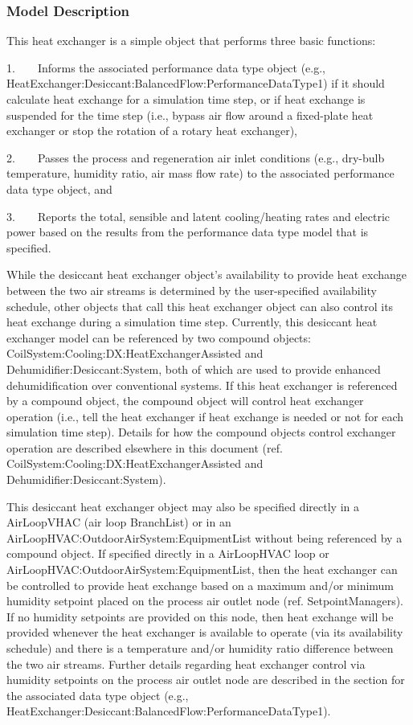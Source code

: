 \subsubsection{Model Description}\label{model-description-2-006}

This heat exchanger is a simple object that performs three basic functions:

1.~~~~Informs the associated performance data type object (e.g., HeatExchanger:Desiccant:BalancedFlow:PerformanceDataType1) if it should calculate heat exchange for a simulation time step, or if heat exchange is suspended for the time step (i.e., bypass air flow around a fixed-plate heat exchanger or stop the rotation of a rotary heat exchanger),

2.~~~~Passes the process and regeneration air inlet conditions (e.g., dry-bulb temperature, humidity ratio, air mass flow rate) to the associated performance data type object, and

3.~~~~Reports the total, sensible and latent cooling/heating rates and electric power based on the results from the performance data type model that is specified.

While the desiccant heat exchanger object's availability to provide heat exchange between the two air streams is determined by the user-specified availability schedule, other objects that call this heat exchanger object can also control its heat exchange during a simulation time step. Currently, this desiccant heat exchanger model can be referenced by two compound objects: CoilSystem:Cooling:DX:HeatExchangerAssisted and Dehumidifier:Desiccant:System, both of which are used to provide enhanced dehumidification over conventional systems. If this heat exchanger is referenced by a compound object, the compound object will control heat exchanger operation (i.e., tell the heat exchanger if heat exchange is needed or not for each simulation time step). Details for how the compound objects control exchanger operation are described elsewhere in this document (ref. CoilSystem:Cooling:DX:HeatExchangerAssisted and Dehumidifier:Desiccant:System).

This desiccant heat exchanger object may also be specified directly in a AirLoopVHAC (air loop BranchList) or in an AirLoopHVAC:OutdoorAirSystem:EquipmentList without being referenced by a compound object. If specified directly in a AirLoopHVAC loop or AirLoopHVAC:OutdoorAirSystem:EquipmentList, then the heat exchanger can be controlled to provide heat exchange based on a maximum and/or minimum humidity setpoint placed on the process air outlet node (ref. SetpointManagers). If no humidity setpoints are provided on this node, then heat exchange will be provided whenever the heat exchanger is available to operate (via its availability schedule) and there is a temperature and/or humidity ratio difference between the two air streams. Further details regarding heat exchanger control via humidity setpoints on the process air outlet node are described in the section for the associated data type object (e.g., HeatExchanger:Desiccant:BalancedFlow:PerformanceDataType1).

